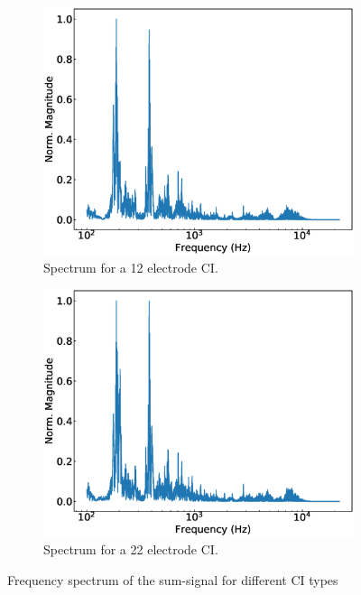 \documentclass{scrartcl}			%
\begin{document}
\begin{figure}[H]
   		 \begin{subfigure}[b]{0.49\linewidth}
   		 \includegraphics[width=\linewidth]{imgs/filtered_12_fft.eps}
   		 \caption{Spectrum for a 12 electrode CI.} 
   		 \label{fig:ci_3} 
   		 \end{subfigure}
   		 \begin{subfigure}[b]{0.49\linewidth}
   		 \includegraphics[width=\linewidth]{imgs/filtered_22_fft.eps}
   		 \caption{Spectrum for a 22 electrode CI.} 
   		 \label{fig:ci_3} 
   		 \end{subfigure}
   		\caption{Frequency spectrum of the sum-signal for different CI types}
   		\label{fig:spectograms}
\end{figure}
\end{document}
